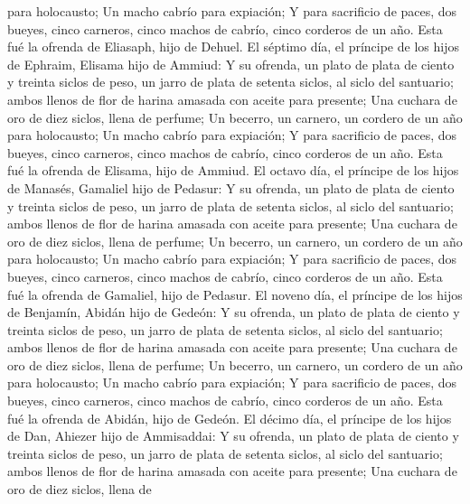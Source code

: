 para holocausto;  Un macho cabrío para expiación;
 Y para sacrificio de paces, dos bueyes, cinco carneros,
cinco machos de cabrío, cinco corderos de un año. Esta fué la ofrenda de
Eliasaph, hijo de Dehuel.  El séptimo día, el príncipe de
los hijos de Ephraim, Elisama hijo de Ammiud:  Y su
ofrenda, un plato de plata de ciento y treinta siclos de peso, un jarro
de plata de setenta siclos, al siclo del santuario; ambos llenos de flor
de harina amasada con aceite para presente;  Una cuchara
de oro de diez siclos, llena de perfume;  Un becerro, un
carnero, un cordero de un año para holocausto;  Un macho
cabrío para expiación;  Y para sacrificio de paces, dos
bueyes, cinco carneros, cinco machos de cabrío, cinco corderos de un
año. Esta fué la ofrenda de Elisama, hijo de Ammiud.  El
octavo día, el príncipe de los hijos de Manasés, Gamaliel hijo de
Pedasur:  Y su ofrenda, un plato de plata de ciento y
treinta siclos de peso, un jarro de plata de setenta siclos, al siclo
del santuario; ambos llenos de flor de harina amasada con aceite para
presente;  Una cuchara de oro de diez siclos, llena de
perfume;  Un becerro, un carnero, un cordero de un año
para holocausto;  Un macho cabrío para expiación;
 Y para sacrificio de paces, dos bueyes, cinco carneros,
cinco machos de cabrío, cinco corderos de un año. Esta fué la ofrenda de
Gamaliel, hijo de Pedasur.  El noveno día, el príncipe de
los hijos de Benjamín, Abidán hijo de Gedeón:  Y su
ofrenda, un plato de plata de ciento y treinta siclos de peso, un jarro
de plata de setenta siclos, al siclo del santuario; ambos llenos de flor
de harina amasada con aceite para presente;  Una cuchara
de oro de diez siclos, llena de perfume;  Un becerro, un
carnero, un cordero de un año para holocausto;  Un macho
cabrío para expiación;  Y para sacrificio de paces, dos
bueyes, cinco carneros, cinco machos de cabrío, cinco corderos de un
año. Esta fué la ofrenda de Abidán, hijo de Gedeón.  El
décimo día, el príncipe de los hijos de Dan, Ahiezer hijo de Ammisaddai:
 Y su ofrenda, un plato de plata de ciento y treinta
siclos de peso, un jarro de plata de setenta siclos, al siclo del
santuario; ambos llenos de flor de harina amasada con aceite para
presente;  Una cuchara de oro de diez siclos, llena de
